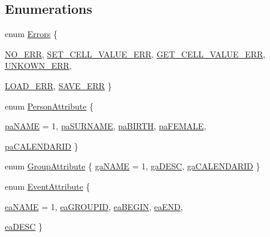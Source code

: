 \subsection*{Enumerations}
\begin{DoxyCompactItemize}
\item 
enum \hyperlink{namespacestorage_aedd3c880e9744762de535deb2adcf6be}{Errors} \{ \par
\hyperlink{namespacestorage_aedd3c880e9744762de535deb2adcf6beab022daa71e205b32600c42a71cd8abd9}{NO\_\-ERR}, 
\hyperlink{namespacestorage_aedd3c880e9744762de535deb2adcf6beacdf2bfcf9aa6c81b977b6f0385c4022f}{SET\_\-CELL\_\-VALUE\_\-ERR}, 
\hyperlink{namespacestorage_aedd3c880e9744762de535deb2adcf6bea9b9b601c702875135dbaadc17ca376a7}{GET\_\-CELL\_\-VALUE\_\-ERR}, 
\hyperlink{namespacestorage_aedd3c880e9744762de535deb2adcf6bea1741e738e284508e65564b0a43330a59}{UNKOWN\_\-ERR}, 
\par
\hyperlink{namespacestorage_aedd3c880e9744762de535deb2adcf6bea1fb229c8079685007285aed87f0602a6}{LOAD\_\-ERR}, 
\hyperlink{namespacestorage_aedd3c880e9744762de535deb2adcf6bea0b2da9195c17eb6b12af46eccc47d558}{SAVE\_\-ERR}
 \}
\item 
enum \hyperlink{namespacestorage_a42f9d3eac07801f5551c7e5b60d6e9ce}{PersonAttribute} \{ \par
\hyperlink{namespacestorage_a42f9d3eac07801f5551c7e5b60d6e9cea1a0f7411f00da5302897feff12e8361f}{paNAME} =  1, 
\hyperlink{namespacestorage_a42f9d3eac07801f5551c7e5b60d6e9cea708252563a34f476cf90705693d55b07}{paSURNAME}, 
\hyperlink{namespacestorage_a42f9d3eac07801f5551c7e5b60d6e9cea331a5ce7e9671db4a25eaba41540f865}{paBIRTH}, 
\hyperlink{namespacestorage_a42f9d3eac07801f5551c7e5b60d6e9cea0a806bbc5839655b252626c681868307}{paFEMALE}, 
\par
\hyperlink{namespacestorage_a42f9d3eac07801f5551c7e5b60d6e9cea66b24ed97a604bec4ac16c41e89739ca}{paCALENDARID}
 \}
\item 
enum \hyperlink{namespacestorage_abe112dd5cc72469c2ce28e3a5ea229a3}{GroupAttribute} \{ \hyperlink{namespacestorage_abe112dd5cc72469c2ce28e3a5ea229a3aa8a524c714d5a7811887d5359a7e84c6}{gaNAME} =  1, 
\hyperlink{namespacestorage_abe112dd5cc72469c2ce28e3a5ea229a3a380f477668caef01a80cab3e3940bbfb}{gaDESC}, 
\hyperlink{namespacestorage_abe112dd5cc72469c2ce28e3a5ea229a3a35e036ae50558c9264292a151fd80e11}{gaCALENDARID}
 \}
\item 
enum \hyperlink{namespacestorage_a6e2b156f6c0c979e3e6d80ed6ba55420}{EventAttribute} \{ \par
\hyperlink{namespacestorage_a6e2b156f6c0c979e3e6d80ed6ba55420a43533b6f3a1c1ec7875ba3a8d4d9f8fe}{eaNAME} =  1, 
\hyperlink{namespacestorage_a6e2b156f6c0c979e3e6d80ed6ba55420a4092a4b1ca1228660fa206d20fd63553}{eaGROUPID}, 
\hyperlink{namespacestorage_a6e2b156f6c0c979e3e6d80ed6ba55420a7cf33f29983d72ae16eae43ca50b6fc3}{eaBEGIN}, 
\hyperlink{namespacestorage_a6e2b156f6c0c979e3e6d80ed6ba55420a23c12949159e98618bf687dd1376ed3b}{eaEND}, 
\par
\hyperlink{namespacestorage_a6e2b156f6c0c979e3e6d80ed6ba55420a9568b5e4855804d48827f151bc9e4689}{eaDESC}
 \}
\end{DoxyCompactItemize}


